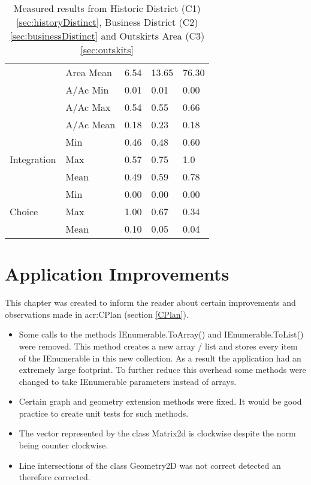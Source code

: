 \begin{table}[h]
\begin{center}
\begin{tabular}{ |l|l|l|l|l| }
            & Area Mean & 6.54 & 13.65 & 76.30 \\
            & A/Ac Min & 0.01 & 0.01 & 0.00 \\
            & A/Ac Max & 0.54 & 0.55 & 0.66 \\
            & A/Ac Mean & 0.18 & 0.23 & 0.18 \\
            \hline
            \multirow{3}{*}{Integration} 
            & Min & 0.46 & 0.48 & 0.60 \\
            & Max & 0.57 & 0.75 & 1.0 \\
            & Mean & 0.49 & 0.59 & 0.78 \\
            \hline
            \multirow{3}{*}{Choice}
            & Min & 0.00 & 0.00 & 0.00 \\
            & Max & 1.00 & 0.67 & 0.34 \\
            & Mean & 0.10 & 0.05 & 0.04 \\
            \hline
        \end{tabular}
        \caption{Measured results from Historic District (C1) \ref{sec:historyDistinct}, Business District (C2) \ref{sec:businessDistinct} and Outskirts Area (C3) \ref{sec:outskits}}
    \end{center}
\end{table}

\pagebreak
\section{Application Improvements}
This chapter was created to inform the reader about certain improvements and observations made in \gls{acr:CPlan} (section \ref{CPlan}).
\begin{itemize}
    \item Some calls to the methods IEnumerable.ToArray() and IEnumerable.ToList() were removed. This method creates a new array / list and stores every item of the IEnumerable in this new collection. As a result the application had an extremely large footprint. To further reduce this overhead some methods were changed to take IEnumerable parameters instead of arrays.
    \item Certain graph and geometry extension methods were fixed. It would be good practice to create unit tests for such methods.
    \item The vector represented by the class Matrix2d is clockwise despite the norm being counter clockwise.
    \item Line intersections of the class Geometry2D was not correct detected an therefore corrected.
\end{itemize}

